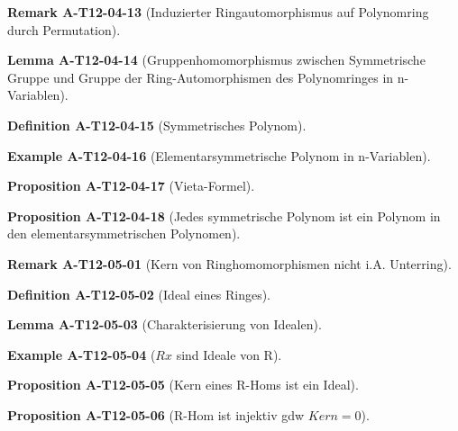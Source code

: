 \documentclass[10pt, letterpaper]{article}
\newcommand{\CustomHeading}[3]{%
  \par\medskip\noindent%
  \textbf{#1 #2} \textnormal{(#3)}.\enskip%
}
\newenvironment{DEF}[2]{\CustomHeading{Definition}{#1}{#2}}{}
\newenvironment{PROP}[2]{\CustomHeading{Proposition}{#1}{#2}}{}
\newenvironment{LEM}[2]{\CustomHeading{Lemma}{#1}{#2}}{}
\newenvironment{REM}[2]{\CustomHeading{Remark}{#1}{#2}}{}
\newenvironment{EXA}[2]{\CustomHeading{Example}{#1}{#2}}{}
\begin{document}
\begin{REM}{A-T12-04-13}{Induzierter Ringautomorphismus auf Polynomring durch Permutation}
\end{REM}

\begin{LEM}{A-T12-04-14}{Gruppenhomomorphismus zwischen Symmetrische Gruppe und Gruppe der Ring-Automorphismen des Polynomringes in n-Variablen}
\end{LEM}

\begin{DEF}{A-T12-04-15}{Symmetrisches Polynom}
\end{DEF}

\begin{EXA}{A-T12-04-16}{Elementarsymmetrische Polynom in n-Variablen}
\end{EXA}

\begin{PROP}{A-T12-04-17}{Vieta-Formel}
\end{PROP}

\begin{PROP}{A-T12-04-18}{Jedes symmetrische Polynom ist ein Polynom in den elementarsymmetrischen Polynomen}
\end{PROP}

\begin{REM}{A-T12-05-01}{Kern von Ringhomomorphismen nicht i.A. Unterring}
\end{REM}

\begin{DEF}{A-T12-05-02}{Ideal eines Ringes}
\end{DEF}

\begin{LEM}{A-T12-05-03}{Charakterisierung von Idealen}
\end{LEM}

\begin{EXA}{A-T12-05-04}{$Rx$ sind Ideale von R}
\end{EXA}

\begin{PROP}{A-T12-05-05}{Kern eines R-Homs ist ein Ideal}
\end{PROP}

\begin{PROP}{A-T12-05-06}{R-Hom ist injektiv gdw $Kern = 0$}
\end{PROP}
\end{document}
